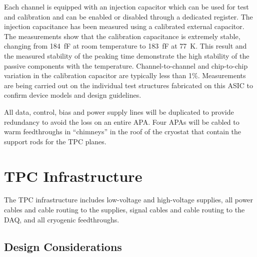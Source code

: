 Each channel is equipped with an injection capacitor which can be used
for test and calibration and can be enabled or disabled through a
dedicated register. The injection capacitance has been measured using 
a calibrated external capacitor. The measurements show
that the calibration capacitance is extremely stable, changing from
184~fF at room temperature to 183~fF at 77~K. This result and the measured
stability of the peaking time demonstrate the high stability of the
passive components with the temperature. Channel-to-channel and chip-to-chip
variation in the calibration capacitor are typically less than 1\%. Measurements are being carried
out on the individual test structures fabricated on this ASIC to
confirm device models and design guidelines.

All data, control, bias and power supply lines will be duplicated to
provide redundancy to avoid the loss on an entire APA.  Four APAs will be
cabled to warm feedthroughs in ``chimneys'' in the roof of the cryostat that
contain the support rods for the TPC planes.

\section{TPC Infrastructure}
\label{sec:v5-tpc-feedthru}
   
The TPC infrastructure includes low-voltage and high-voltage supplies, all power cables and cable routing to the supplies, signal cables and cable routing to the DAQ, and all cryogenic feedthroughs.

\subsection{Design Considerations} 
\label{subsec:v5-tpc-feedthru-reqs-n-specs}

